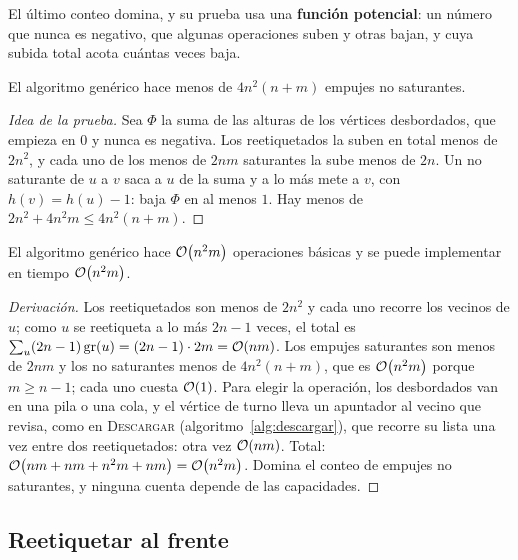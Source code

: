 \documentclass[11pt,letterpaper]{article}
\begin{document}
El último conteo domina, y su prueba usa una \textbf{función
potencial}: un número que nunca es negativo, que algunas operaciones
suben y otras bajan, y cuya subida total acota cuántas veces baja.

\begin{lema}
  \label{lem:push-no-saturantes}
  El algoritmo genérico hace menos de $4n^2(n + m)$ empujes no
  saturantes.
\end{lema}

\begin{proof}[Idea de la prueba]
  Sea $\Phi$ la suma de las alturas de los vértices desbordados, que
  empieza en $0$ y nunca es negativa. Los reetiquetados la suben en
  total menos de $2n^2$, y cada uno de los menos de $2nm$ saturantes
  la sube menos de $2n$. Un no saturante de $u$ a $v$ saca a $u$ de la
  suma y a lo más mete a $v$, con $h(v) = h(u) - 1$: baja $\Phi$ en
  al menos $1$. Hay menos de $2n^2 + 4n^2 m \le 4n^2(n + m)$.
\end{proof}

\begin{teorema}
  \label{teo:push-costo}
  El algoritmo genérico hace $\mathcal{O}\!\left(n^2 m\right)$ operaciones básicas y se
  puede implementar en tiempo $\mathcal{O}\!\left(n^2 m\right)$.
\end{teorema}

\begin{proof}[Derivación]
  Los reetiquetados son menos de $2n^2$ y cada uno recorre los vecinos
  de $u$; como $u$ se reetiqueta a lo más $2n - 1$ veces, el total es
  $\sum_u (2n - 1)\,\text{gr}(u) = (2n - 1) \cdot 2m = \mathcal{O}\!\left(nm\right)$. Los
  empujes saturantes son menos de $2nm$ y los no saturantes menos de
  $4n^2(n + m)$, que es $\mathcal{O}\!\left(n^2 m\right)$ porque $m \ge n - 1$; cada uno
  cuesta $\mathcal{O}\!\left(1\right)$. Para elegir la operación, los desbordados van en
  una pila o una cola, y el vértice de turno lleva un apuntador al
  vecino que revisa, como en \textsc{Descargar}
  (algoritmo~\ref{alg:descargar}), que recorre su lista una vez entre
  dos reetiquetados: otra vez $\mathcal{O}\!\left(nm\right)$. Total:
  $\mathcal{O}\!\left(nm + nm + n^2 m + nm\right) = \mathcal{O}\!\left(n^2 m\right)$. Domina el conteo de
  empujes no saturantes, y ninguna cuenta depende de las capacidades.
\end{proof}


\subsection*{Reetiquetar al frente}
\end{document}
